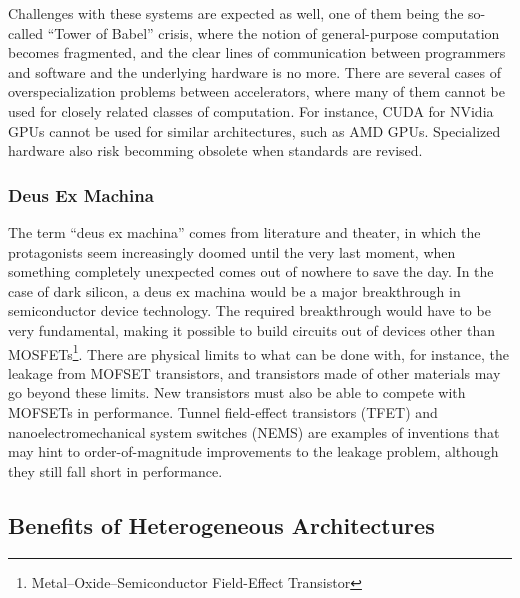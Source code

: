 
Challenges with these systems are expected as well, one of them being the so-called ``Tower of Babel'' crisis, where
the notion of general-purpose computation becomes fragmented, and the clear lines of communication between programmers and software and the underlying hardware is no more.
There are several cases of overspecialization problems between accelerators, where many of them cannot be used for closely related classes of computation.
For instance, CUDA for NVidia GPUs cannot be used for similar architectures, such as AMD GPUs.
Specialized hardware also risk becomming obsolete when standards are revised. \cite{dark-silicon}

\subsubsection{Deus Ex Machina}
The term ``deus ex machina'' comes from literature and theater, in which the protagonists seem increasingly doomed until the very last moment, when something completely unexpected comes out of nowhere to save the day.
In the case of dark silicon, a deus ex machina would be a major breakthrough in semiconductor device technology.
The required breakthrough would have to be very fundamental, making it possible to build circuits out of devices other than MOSFETs\footnote{Metal–Oxide–Semiconductor Field-Effect Transistor}. 
There are physical limits to what can be done with, for instance, the leakage from MOFSET transistors, and transistors made of other materials may go beyond these limits.
New transistors must also be able to compete with MOFSETs in performance.
Tunnel field-effect transistors (TFET) and nanoelectromechanical system switches (NEMS) are examples of inventions that may hint to order-of-magnitude improvements to the leakage problem, although they still fall short in performance. \cite{dark-silicon}

\subsection{Benefits of Heterogeneous Architectures}
\label{sec:heterogeneous}

